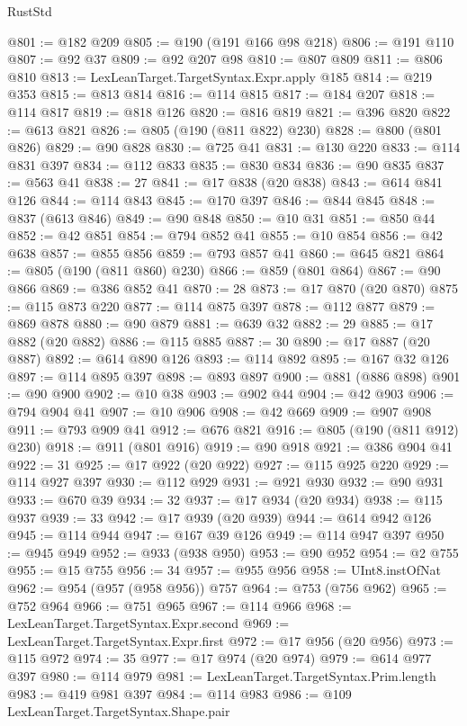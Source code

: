 \begin{lexlean}{RustStd}
\begin{coremodule}
{\begin{coremodule}
{{{{{{{{{{{{{{{{{{{{{{{{{{{{{{{{{{{{{{{{{{{{{{{{{{@801 := @182 @209
@805 := @190 (@191 @166 @98 @218)
@806 := @191 @110
@807 := @92 @37
@809 := @92 @207 @98
@810 := @807 @809
@811 := @806 @810
@813 := LexLeanTarget.TargetSyntax.Expr.apply @185
@814 := @219 @353
@815 := @813 @814
@816 := @114 @815
@817 := @184 @207
@818 := @114 @817
@819 := @818 @126
@820 := @816 @819
@821 := @396 @820
@822 := @613 @821
@826 := @805 (@190 (@811 @822) @230)
@828 := @800 (@801 @826)
@829 := @90 @828
@830 := @725 @41
@831 := @130 @220
@833 := @114 @831 @397
@834 := @112 @833
@835 := @830 @834
@836 := @90 @835
@837 := @563 @41
@838 := 27
@841 := @17 @838 (@20 @838)
@843 := @614 @841 @126
@844 := @114 @843
@845 := @170 @397
@846 := @844 @845
@848 := @837 (@613 @846)
@849 := @90 @848
@850 := @10 @31
@851 := @850 @44
@852 := @42 @851
@854 := @794 @852 @41
@855 := @10 @854
@856 := @42 @638
@857 := @855 @856
@859 := @793 @857 @41
@860 := @645 @821
@864 := @805 (@190 (@811 @860) @230)
@866 := @859 (@801 @864)
@867 := @90 @866
@869 := @386 @852 @41
@870 := 28
@873 := @17 @870 (@20 @870)
@875 := @115 @873 @220
@877 := @114 @875 @397
@878 := @112 @877
@879 := @869 @878
@880 := @90 @879
@881 := @639 @32
@882 := 29
@885 := @17 @882 (@20 @882)
@886 := @115 @885
@887 := 30
@890 := @17 @887 (@20 @887)
@892 := @614 @890 @126
@893 := @114 @892
@895 := @167 @32 @126
@897 := @114 @895 @397
@898 := @893 @897
@900 := @881 (@886 @898)
@901 := @90 @900
@902 := @10 @38
@903 := @902 @44
@904 := @42 @903
@906 := @794 @904 @41
@907 := @10 @906
@908 := @42 @669
@909 := @907 @908
@911 := @793 @909 @41
@912 := @676 @821
@916 := @805 (@190 (@811 @912) @230)
@918 := @911 (@801 @916)
@919 := @90 @918
@921 := @386 @904 @41
@922 := 31
@925 := @17 @922 (@20 @922)
@927 := @115 @925 @220
@929 := @114 @927 @397
@930 := @112 @929
@931 := @921 @930
@932 := @90 @931
@933 := @670 @39
@934 := 32
@937 := @17 @934 (@20 @934)
@938 := @115 @937
@939 := 33
@942 := @17 @939 (@20 @939)
@944 := @614 @942 @126
@945 := @114 @944
@947 := @167 @39 @126
@949 := @114 @947 @397
@950 := @945 @949
@952 := @933 (@938 @950)
@953 := @90 @952
@954 := @2 @755
@955 := @15 @755
@956 := 34
@957 := @955 @956
@958 := UInt8.instOfNat
@962 := @954 (@957 (@958 @956)) @757
@964 := @753 (@756 @962)
@965 := @752 @964
@966 := @751 @965
@967 := @114 @966
@968 := LexLeanTarget.TargetSyntax.Expr.second
@969 := LexLeanTarget.TargetSyntax.Expr.first
@972 := @17 @956 (@20 @956)
@973 := @115 @972
@974 := 35
@977 := @17 @974 (@20 @974)
@979 := @614 @977 @397
@980 := @114 @979
@981 := LexLeanTarget.TargetSyntax.Prim.length
@983 := @419 @981 @397
@984 := @114 @983
@986 := @109 LexLeanTarget.TargetSyntax.Shape.pair
}}}}}}}}}}}}}}}}}}}}}}}}}}}}}}}}}}}}}}}}}}}}}}}}}}
\end{coremodule}}
\end{coremodule}
\end{lexlean}
